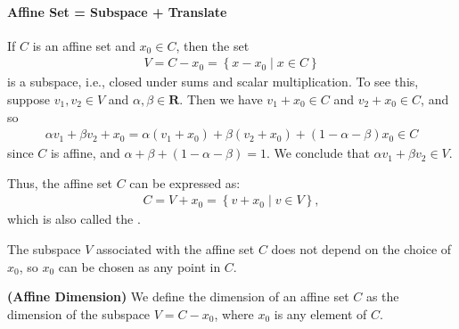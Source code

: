 \documentclass{article}
\newcommand{\bfs}[1]{\textbf{({#1}) }}
\begin{document}
\paragraph{Affine Set = Subspace + Translate}
If $C$ is an affine set and $x_{0} \in C$, then the set
\begin{align*}
V=C-x_{0}=\left\{x-x_{0} \mid x \in C\right\}
\end{align*}
is a subspace, i.e., closed under sums and scalar multiplication. To see this, suppose $v_{1}, v_{2} \in V$ and $\alpha, \beta \in \mathbf{R}$. Then we have $v_{1}+x_{0} \in C$ and $v_{2}+x_{0} \in C$, and so
\begin{align*}
\alpha v_{1}+\beta v_{2}+x_{0}=\alpha\left(v_{1}+x_{0}\right)+\beta\left(v_{2}+x_{0}\right)+(1-\alpha-\beta) x_{0} \in C
\end{align*}
since $C$ is affine, and $\alpha+\beta+(1-\alpha-\beta)=1 .$ We conclude that $\alpha v_{1}+\beta v_{2} \in V$.

\begin{lema}
Thus, the affine set $C$ can be expressed as:
\begin{align*}
C=V+x_{0}=\left\{v+x_{0} \mid v \in V\right\},
\end{align*}
which is also called the .
\end{lema}
\begin{rema}
The subspace $V$ associated with the affine set $C$ does not depend on the choice of $x_{0}$, so $x_{0}$ can be chosen as any point in $C$.
\end{rema}
\begin{defa}{\bfs{Affine Dimension}}
  We define the dimension of an affine set $C$ as the dimension of the subspace $V=C-x_{0}$, where $x_{0}$ is any element of $C$.
\end{defa}
\end{document}
